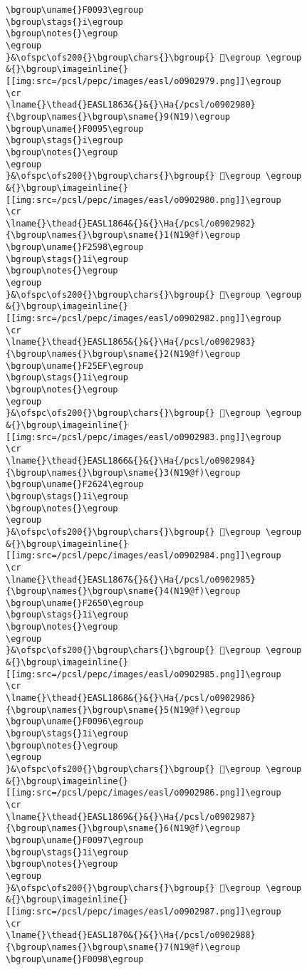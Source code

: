 \begin{verbatim}
\bgroup\uname{}F0093\egroup
\bgroup\stags{}i\egroup
\bgroup\notes{}\egroup
\egroup
}&\ofspc\ofs200{}\bgroup\chars{}\bgroup{} 󰂓\egroup \egroup
&{}\bgroup\imageinline{}[[img:src=/pcsl/pepc/images/easl/o0902979.png]]\egroup
\cr
\lname{}\thead{}EASL1863&{}&{}\Ha{/pcsl/o0902980}{\bgroup\names{}\bgroup\sname{}9(N19)\egroup
\bgroup\uname{}F0095\egroup
\bgroup\stags{}i\egroup
\bgroup\notes{}\egroup
\egroup
}&\ofspc\ofs200{}\bgroup\chars{}\bgroup{} 󰂕\egroup \egroup
&{}\bgroup\imageinline{}[[img:src=/pcsl/pepc/images/easl/o0902980.png]]\egroup
\cr
\lname{}\thead{}EASL1864&{}&{}\Ha{/pcsl/o0902982}{\bgroup\names{}\bgroup\sname{}1(N19@f)\egroup
\bgroup\uname{}F2598\egroup
\bgroup\stags{}1i\egroup
\bgroup\notes{}\egroup
\egroup
}&\ofspc\ofs200{}\bgroup\chars{}\bgroup{} 󲖘\egroup \egroup
&{}\bgroup\imageinline{}[[img:src=/pcsl/pepc/images/easl/o0902982.png]]\egroup
\cr
\lname{}\thead{}EASL1865&{}&{}\Ha{/pcsl/o0902983}{\bgroup\names{}\bgroup\sname{}2(N19@f)\egroup
\bgroup\uname{}F25EF\egroup
\bgroup\stags{}1i\egroup
\bgroup\notes{}\egroup
\egroup
}&\ofspc\ofs200{}\bgroup\chars{}\bgroup{} 󲗯\egroup \egroup
&{}\bgroup\imageinline{}[[img:src=/pcsl/pepc/images/easl/o0902983.png]]\egroup
\cr
\lname{}\thead{}EASL1866&{}&{}\Ha{/pcsl/o0902984}{\bgroup\names{}\bgroup\sname{}3(N19@f)\egroup
\bgroup\uname{}F2624\egroup
\bgroup\stags{}1i\egroup
\bgroup\notes{}\egroup
\egroup
}&\ofspc\ofs200{}\bgroup\chars{}\bgroup{} 󲘤\egroup \egroup
&{}\bgroup\imageinline{}[[img:src=/pcsl/pepc/images/easl/o0902984.png]]\egroup
\cr
\lname{}\thead{}EASL1867&{}&{}\Ha{/pcsl/o0902985}{\bgroup\names{}\bgroup\sname{}4(N19@f)\egroup
\bgroup\uname{}F2650\egroup
\bgroup\stags{}1i\egroup
\bgroup\notes{}\egroup
\egroup
}&\ofspc\ofs200{}\bgroup\chars{}\bgroup{} 󲙐\egroup \egroup
&{}\bgroup\imageinline{}[[img:src=/pcsl/pepc/images/easl/o0902985.png]]\egroup
\cr
\lname{}\thead{}EASL1868&{}&{}\Ha{/pcsl/o0902986}{\bgroup\names{}\bgroup\sname{}5(N19@f)\egroup
\bgroup\uname{}F0096\egroup
\bgroup\stags{}1i\egroup
\bgroup\notes{}\egroup
\egroup
}&\ofspc\ofs200{}\bgroup\chars{}\bgroup{} 󰂖\egroup \egroup
&{}\bgroup\imageinline{}[[img:src=/pcsl/pepc/images/easl/o0902986.png]]\egroup
\cr
\lname{}\thead{}EASL1869&{}&{}\Ha{/pcsl/o0902987}{\bgroup\names{}\bgroup\sname{}6(N19@f)\egroup
\bgroup\uname{}F0097\egroup
\bgroup\stags{}1i\egroup
\bgroup\notes{}\egroup
\egroup
}&\ofspc\ofs200{}\bgroup\chars{}\bgroup{} 󰂗\egroup \egroup
&{}\bgroup\imageinline{}[[img:src=/pcsl/pepc/images/easl/o0902987.png]]\egroup
\cr
\lname{}\thead{}EASL1870&{}&{}\Ha{/pcsl/o0902988}{\bgroup\names{}\bgroup\sname{}7(N19@f)\egroup
\bgroup\uname{}F0098\egroup

\end{verbatim}
